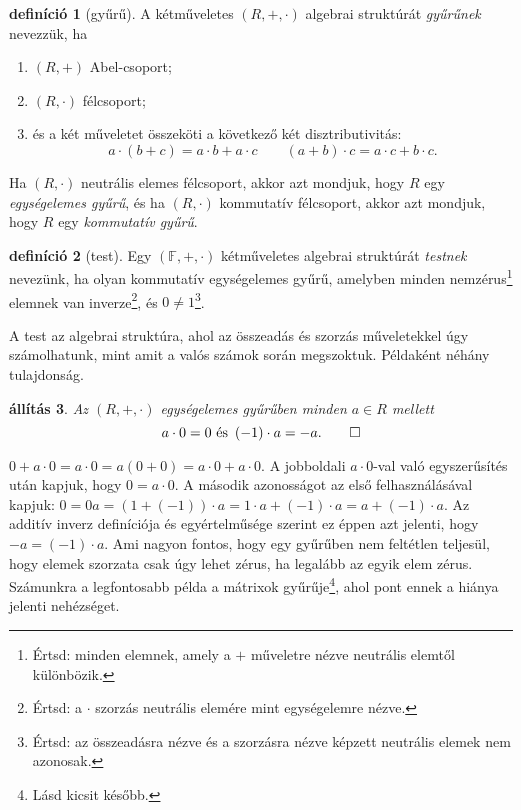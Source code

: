 \documentclass[9pt, a4paper, showtrims]{memoir}
\makeatletter
\renewenvironment{proof}[1][\proofname]
    {\par\pushQED{\qed}%
    \normalfont \topsep6\p@\@plus6\p@\relax
    \trivlist
    \item[\hskip\labelsep
        \itshape
    #1\@addpunct{:}]\ignorespaces}
    {\popQED\endtrivlist\@endpefalse}
\theoremstyle{plain}
\newtheorem{proposition}{állítás}[chapter]
\theoremstyle{remark}
\theoremstyle{definition}
\newtheorem{definition}[proposition]{definíció}
\makeatother
\begin{document}
\begin{definition}[gyűrű]
	A kétműveletes $\left( R,+,\cdot \right)$ algebrai struktúrát \emph{gyűrűnek} nevezzük,
	ha
	\begin{enumerate}
		\item $\left( R,+ \right)$ Abel-csoport;
		\item $\left( R,\cdot \right)$ félcsoport;
		\item és a két műveletet összeköti a következő két disztributivitás:
		      \[
			      a\cdot\left( b+c \right)=a\cdot b + a\cdot c\qquad
			      \left( a + b \right)\cdot c=a\cdot c+b\cdot c.
		      \]
	\end{enumerate}
	Ha $\left( R,\cdot \right)$ neutrális elemes félcsoport, akkor azt mondjuk, hogy $R$ egy
	\emph{egységelemes gyűrű}, és ha $\left( R,\cdot \right)$ kommutatív félcsoport, akkor
	azt mondjuk, hogy $R$ egy \emph{kommutatív gyűrű}.
\end{definition}
\begin{definition}[test]
	Egy $\left( \mathbb{F},+,\cdot \right)$ kétműveletes algebrai struktúrát \emph{testnek}
	nevezünk,
	ha olyan kommutatív egységelemes gyűrű,
	amelyben minden nemzérus\footnote{Értsd: minden elemnek, amely a $+$ műveletre nézve neutrális elemtől különbözik.}
	elemnek van inverze\footnote{Értsd: a $\cdot$ szorzás neutrális elemére mint egységelemre nézve.},
	és $0\neq 1$\footnote{Értsd: az összeadásra nézve és a szorzásra nézve képzett neutrális elemek nem azonosak.}.
\end{definition}
A test az algebrai struktúra, ahol az összeadás és szorzás műveletekkel úgy számolhatunk, mint amit a valós számok során megszoktuk.
Példaként néhány tulajdonság.
\begin{proposition}
	Az $\left( R,+,\cdot \right)$ egységelemes gyűrűben minden $a\in R$ mellett
	\begin{equation*}
		a\cdot 0=0\text{ és }
		\left( -1 \right)\cdot a=-a.\qedhere
	\end{equation*}
\end{proposition}
\begin{proof}
	\begin{math}
		0+a\cdot 0=
		a\cdot 0=
		a\left( 0+0 \right)=
		a\cdot 0+a\cdot 0.
	\end{math}
	A jobboldali $a\cdot 0$-val való egyszerűsítés után kapjuk,
	hogy $0=a\cdot 0$.
	A második azonosságot az első felhasználásával kapjuk:
	\begin{math}
		0
		=
		0a
		=
		\left( 1+\left( -1 \right) \right)\cdot a
		=
		1\cdot a + \left( -1 \right)\cdot a
		=
		a +\left( -1 \right)\cdot a.
	\end{math}
	Az additív inverz definíciója és egyértelműsége szerint ez éppen azt jelenti, hogy $-a=\left( -1 \right)\cdot a$.
\end{proof}
Ami nagyon fontos, hogy egy gyűrűben nem feltétlen teljesül,
hogy elemek szorzata csak úgy lehet zérus, ha legalább az egyik elem zérus.
Számunkra a legfontosabb példa  a mátrixok gyűrűje\footnote{Lásd kicsit később.},
ahol pont ennek a hiánya jelenti nehézséget.
\end{document}
